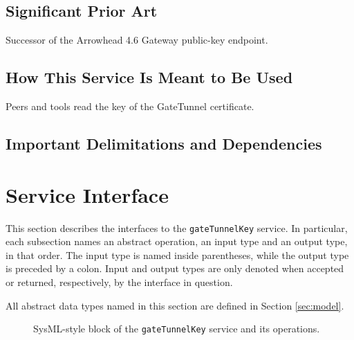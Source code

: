 \documentclass[a4paper]{arrowhead}
\begin{document}
\subsection{Significant Prior Art}

Successor of the Arrowhead 4.6 Gateway public-key endpoint.

\subsection{How This Service Is Meant to Be Used}

Peers and tools read the key of the GateTunnel certificate.

\subsection{Important Delimitations and Dependencies}
\label{sec:delimitations}



\newpage

\section{Service Interface}
\label{sec:operations}

This section describes the interfaces to the \texttt{gateTunnelKey} service.
In particular, each subsection names an abstract operation, an input type and an output type, in that order.
The input type is named inside parentheses, while the output type is preceded by a colon.
Input and output types are only denoted when accepted or returned, respectively, by the interface in question.

All abstract data types named in this section are defined in Section \ref{sec:model}.

\begin{figure}[ht!]
  \centering
  \caption{SysML-style block of the \texttt{gateTunnelKey} service and its operations.}
  \label{fig:SD}
\end{figure}
\end{document}
